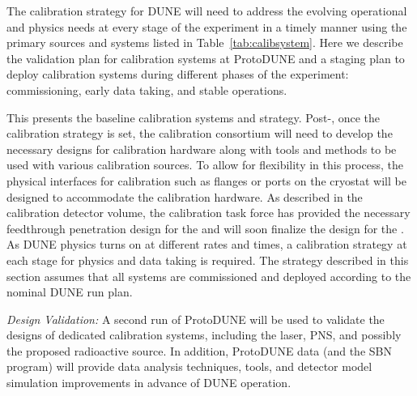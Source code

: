 
The calibration strategy for DUNE will need to address the evolving operational and physics needs at every stage of the experiment in a timely manner using the primary sources and systems listed in Table~\ref{tab:calibsystem}. 
Here we describe the validation plan for calibration systems at ProtoDUNE and a staging plan to deploy calibration systems during different phases of the experiment: commissioning, early data taking, and stable operations. 

This  presents the baseline calibration systems and strategy. Post-, once the calibration strategy is set, the calibration consortium will need to develop the necessary designs for calibration hardware along with tools and methods to be used with various calibration sources. To allow for flexibility in this process, the physical interfaces for calibration such as flanges or ports on the cryostat will be designed to accommodate the calibration hardware. As described in the calibration  detector volume, the calibration task force has provided the necessary feedthrough penetration design 
for the  and will soon finalize the design for the .  As DUNE physics turns on at different rates and times, a calibration strategy at each stage for physics and data taking is required. The strategy described in this section assumes that all systems are commissioned and deployed according to the nominal DUNE run plan.

\textit{Design Validation:} A second run of ProtoDUNE will be used to validate the designs of dedicated calibration systems, including the laser, PNS, and possibly the proposed radioactive source. In addition, ProtoDUNE data (and the SBN program) will provide data analysis techniques, tools, and detector model simulation improvements in advance of DUNE operation.


